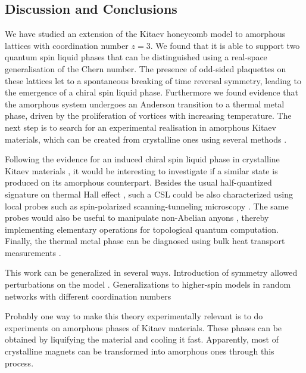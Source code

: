 \hypertarget{discussion-and-conclusions}{%
\subsection{Discussion and
Conclusions}\label{discussion-and-conclusions}}

We have studied an extension of the Kitaev honeycomb model to amorphous
lattices with coordination number \(z= 3\). We found that it is able to
support two quantum spin liquid phases that can be distinguished using a
real-space generalisation of the Chern number. The presence of odd-sided
plaquettes on these lattices let to a spontaneous breaking of time
reversal symmetry, leading to the emergence of a chiral spin liquid
phase. Furthermore we found evidence that the amorphous system undergoes
an Anderson transition to a thermal metal phase, driven by the
proliferation of vortices with increasing temperature. The next step is
to search for an experimental realisation in amorphous Kitaev materials,
which can be created from crystalline ones using several methods
\autocite{Weaire1976,Petrakovski1981,Kaneyoshi2018}.

Following the evidence for an induced chiral spin liquid phase in
crystalline Kitaev materials
\autocite{Kasahara2018,Yokoi2021,Yamashita2020,Bruin2022}, it would be
interesting to investigate if a similar state is produced on its
amorphous counterpart. Besides the usual half-quantized signature on
thermal Hall effect
\autocite{Kasahara2018,Yokoi2021,Yamashita2020,Bruin2022}, such a CSL
could be also characterized using local probes such as spin-polarized
scanning-tunneling microscopy
\autocite{Feldmeier2020,Konig2020,Udagawa2021}. The same probes would
also be useful to manipulate non-Abelian anyons \autocite{Pereira2020},
thereby implementing elementary operations for topological quantum
computation. Finally, the thermal metal phase can be diagnosed using
bulk heat transport measurements \autocite{Beenakker2013}.

This work can be generalized in several ways. Introduction of symmetry
allowed perturbations on the model
\autocite{Rau2014,Chaloupka2010,Chaloupka2013,Chaloupka2015,Winter2016}.
Generalizations to higher-spin models in random networks with different
coordination numbers
\autocite{Baskaran2008,Yao2009,Nussinov2009,Yao2011,Chua2011,Natori2020,Chulliparambil2020,Chulliparambil2021,Seifert2020,WangHaoranPRB2021,Wu2009}

Probably one way to make this theory experimentally relevant is to do
experiments on amorphous phases of Kitaev materials. These phases can be
obtained by liquifying the material and cooling it fast. Apparently,
most of crystalline magnets can be transformed into amorphous ones
through this process.

